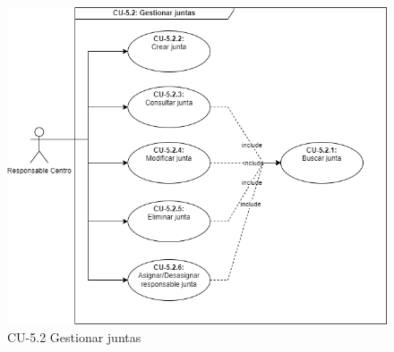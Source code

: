 \begin{figure}[H]
        \centering
        \includegraphics[scale=0.55]{img/diagramas/Funcional/CU-5.2.png}
        \caption{CU-5.2 Gestionar juntas}
        \label{fig:Diagrama-Caso de uso 5.2 Gestionar juntas}
    \end{figure}


